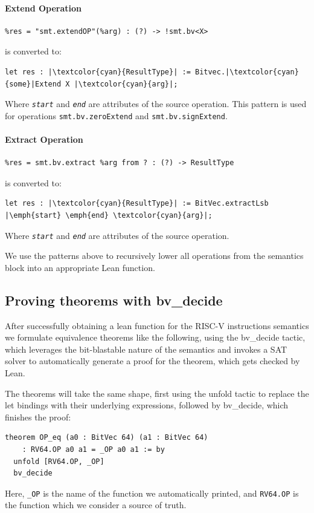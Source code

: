 \paragraph{Extend Operation}

\begin{verbatim}
%res = "smt.extendOP"(%arg) : (?) -> !smt.bv<X>
\end{verbatim}
is converted to:
\begin{verbatim}
let res : |\textcolor{cyan}{ResultType}| := Bitvec.|\textcolor{cyan}{some}|Extend X |\textcolor{cyan}{arg}|;
\end{verbatim}
Where \emph{\texttt{start}} and \emph{\texttt{end}} are attributes of the source operation.
%
This pattern is used for operations \texttt{smt.bv.zeroExtend} and \texttt{smt.bv.signExtend}.

\paragraph{Extract Operation}

\begin{verbatim}
%res = smt.bv.extract %arg from ? : (?) -> ResultType
\end{verbatim}
is converted to:
\begin{verbatim}
let res : |\textcolor{cyan}{ResultType}| := BitVec.extractLsb |\emph{start} \emph{end} \textcolor{cyan}{arg}|;
\end{verbatim}
Where \emph{\texttt{start}} and \emph{\texttt{end}} are attributes of the source operation.

We use the patterns above to recursively lower all operations from the semantics block into an 
appropriate Lean function.

\subsection{Proving theorems with bv\_decide}

After successfully obtaining a lean function for the RISC-V instructions semantics we formulate 
equivalence theorems like the following, using the bv\_decide tactic, which leverages the 
bit-blastable nature of the semantics and invokes a SAT solver to automatically generate a proof
for the theorem, which gets checked by Lean.

The theorems will take the same shape, first using the unfold tactic to replace the let bindings
with their underlying expressions, followed by bv\_decide, which finishes the proof:
\begin{verbatim}
theorem OP_eq (a0 : BitVec 64) (a1 : BitVec 64) 
    : RV64.OP a0 a1 = _OP a0 a1 := by
  unfold [RV64.OP, _OP]
  bv_decide
\end{verbatim}
Here, \texttt{\_OP} is the name of the function we automatically printed, and \texttt{RV64.OP} is
the function which we consider a source of truth.

